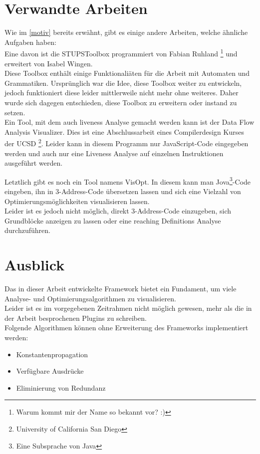 \section{Verwandte Arbeiten}

Wie im \cref{motiv} bereits erwähnt, gibt es einige andere Arbeiten,
welche ähnliche Aufgaben haben:\\

Eine davon ist die STUPSToolbox\cite{toolbox} programmiert von Fabian Ruhland
\footnote{Warum kommt mir der Name so bekannt vor? :)}
und erweitert von Isabel Wingen.\\
Diese Toolbox enthält einige Funktionaliäten für die Arbeit mit Automaten
und Grammatiken. Ursprünglich war die Idee, diese Toolbox weiter zu entwickeln,
jedoch funktioniert diese leider mittlerweile nicht mehr ohne weiteres. Daher wurde
sich dagegen entschieden, diese Toolbox zu erweitern oder instand zu setzen.\\

Ein Tool, mit dem auch liveness Analyse gemacht werden kann ist der
Data Flow Analysis Visualizer\cite{dfav}. Dies ist eine Abschlussarbeit\cite{dfavpres}
eines Compilerdesign Kurses der UCSD
\footnote{University of California San Diego}.
Leider kann in diesem Programm nur JavaScript-Code eingegeben werden
und auch nur eine Liveness Analyse auf einzelnen Instruktionen ausgeführt werden.

Letztlich gibt es noch ein Tool namens VisOpt\cite{VisOpt}.
In diesem kann man Jova\footnote{Eine Subsprache von Java}-Code eingeben,
ihn in 3-Address-Code übersetzen lassen und sich eine Vielzahl 
von Optimierungsmöglichkeiten visualisieren lassen.\\
Leider ist es jedoch nicht möglich, direkt 3-Address-Code einzugeben,
sich Grundblöcke anzeigen zu lassen oder eine reaching Definitions Analyse
durchzuführen.\\

\newpage
\section{Ausblick}
Das in dieser Arbeit entwickelte Framework bietet ein Fundament, 
um viele Analyse- und Optimierungsalgorithmen zu visualisieren.\\
Leider ist es im vorgegebenen Zeitrahmen nicht möglich gewesen, mehr als
die in der Arbeit besprochenen Plugins zu schreiben.\\

Folgende Algorithmen können ohne Erweiterung des Frameworks implementiert werden:
\begin{itemize}
  \item Konstantenpropagation
  \item Verfügbare Ausdrücke
  \item Eliminierung von Redundanz
\end{itemize}

